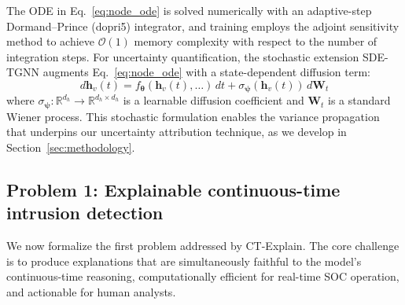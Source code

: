 \documentclass[preprint,review,12pt]{elsarticle}
\newcommand{\vh}{\mathbf{h}}            %
\newcommand{\vtheta}{\boldsymbol{\theta}} %
\newcommand{\vpsi}{\boldsymbol{\psi}}     %
\newcommand{\R}{\mathbb{R}}
\newcommand{\calO}{\mathcal{O}}
\begin{document}
The ODE in Eq.~\eqref{eq:node_ode} is solved numerically with an adaptive-step Dormand--Prince (dopri5) integrator, and training employs the adjoint sensitivity method to achieve $\calO(1)$ memory complexity with respect to the number of integration steps. For uncertainty quantification, the stochastic extension SDE-TGNN augments Eq.~\eqref{eq:node_ode} with a state-dependent diffusion term:
\begin{equation}\label{eq:sde_tgnn}
    d\vh_v(t) = f_{\vtheta}(\vh_v(t), \ldots)\,dt + \sigma_{\vpsi}(\vh_v(t))\,d\mathbf{W}_t
\end{equation}
where $\sigma_{\vpsi}: \R^{d_h} \to \R^{d_h \times d_h}$ is a learnable diffusion coefficient and $\mathbf{W}_t$ is a standard Wiener process. This stochastic formulation enables the variance propagation that underpins our uncertainty attribution technique, as we develop in Section~\ref{sec:methodology}.

\subsection{Problem 1: Explainable continuous-time intrusion detection}
\label{subsec:problem1}

We now formalize the first problem addressed by CT-Explain. The core challenge is to produce explanations that are simultaneously faithful to the model's continuous-time reasoning, computationally efficient for real-time SOC operation, and actionable for human analysts.
\end{document}
